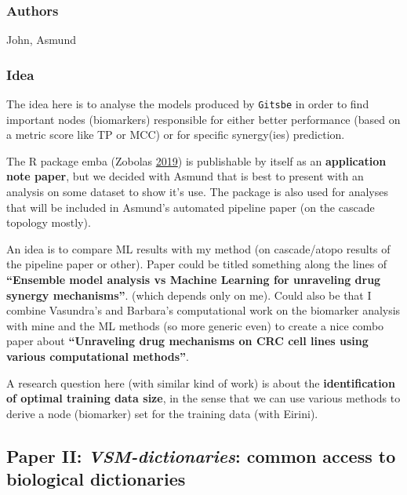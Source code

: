 \documentclass[12pt,]{book}
\begin{document}
\hypertarget{authors}{%
\subsubsection*{Authors}\label{authors}}

John, Asmund

\hypertarget{idea}{%
\subsubsection*{Idea}\label{idea}}

The idea here is to analyse the models produced by \texttt{Gitsbe} in order to find important nodes (biomarkers) responsible for either better performance (based on a metric score like TP or MCC) or for specific synergy(ies) prediction.

The R package emba (Zobolas \protect\hyperlink{ref-R-emba}{2019}) is publishable by itself as an \textbf{application note paper},
but we decided with Asmund that is best to present with an analysis on some dataset
to show it's use. The package is also used for analyses that will be included in
Asmund's automated pipeline paper (on the cascade topology mostly).

An idea is to compare ML results with my method (on cascade/atopo results of the pipeline
paper or other). Paper could be titled something along the lines of
\textbf{``Ensemble model analysis vs Machine Learning for unraveling drug synergy mechanisms''}.
(which depends only on me). Could also be that I combine Vasundra's and
Barbara's computational work on the biomarker analysis with mine and the ML
methods (so more generic even) to create a nice combo paper about \textbf{``Unraveling drug mechanisms on CRC
cell lines using various computational methods''}.

A research question here (with similar kind of work) is about the
\textbf{identification of optimal training data size}, in the sense that we can use
various methods to derive a node (biomarker) set for the training data (with Eirini).

\hypertarget{paper-ii-vsm-dictionaries-common-access-to-biological-dictionaries}{%
\subsection*{\texorpdfstring{Paper II: \emph{VSM-dictionaries}: common access to biological dictionaries}{Paper II: VSM-dictionaries: common access to biological dictionaries}}\label{paper-ii-vsm-dictionaries-common-access-to-biological-dictionaries}}
\end{document}
